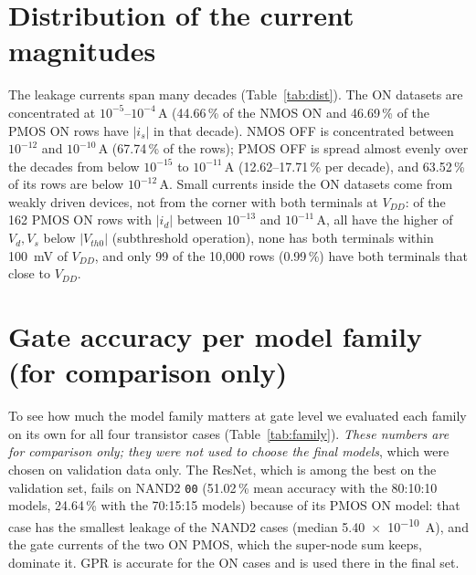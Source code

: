\appendices

\ifexpDist
\section{Distribution of the current magnitudes}\label{app:dist}
The leakage currents span many decades (Table~\ref{tab:dist}). The ON datasets are concentrated at $10^{-5}$--$10^{-4}$\,\si{\ampere} (44.66\,\% of the NMOS ON and 46.69\,\% of the PMOS ON rows have $|i_s|$ in that decade). NMOS OFF is concentrated between $10^{-12}$ and $10^{-10}$\,\si{\ampere} (67.74\,\% of the rows); PMOS OFF is spread almost evenly over the decades from below $10^{-15}$ to $10^{-11}$\,\si{\ampere} (12.62--17.71\,\% per decade), and 63.52\,\% of its rows are below $10^{-12}$\,\si{\ampere}.
Small currents inside the ON datasets come from weakly driven devices, not from the corner with both terminals at $V_{DD}$: of the 162 PMOS ON rows with $|i_d|$ between $10^{-13}$ and $10^{-11}$\,\si{\ampere}, all have the higher of $V_d,V_s$ below $|V_{th0}|$ (subthreshold operation), none has both terminals within \SI{100}{\milli\volt} of $V_{DD}$, and only 99 of the 10,000 rows (0.99\,\%) have both terminals that close to $V_{DD}$.
\begin{table}[t]
\caption{Distribution of $|i_s|$ in percent of the 10,000 rows per case.}
\label{tab:dist}
\centering\footnotesize
\setlength{\tabcolsep}{3pt}
\fitcol{}
\end{table}
\fi

\ifexpFamilies
\section{Gate accuracy per model family (for comparison only)}\label{app:family}
To see how much the model family matters at gate level we evaluated each family on its own for all four transistor cases (Table~\ref{tab:family}). \emph{These numbers are for comparison only; they were not used to choose the final models}, which were chosen on validation data only. The ResNet, which is among the best on the validation set, fails on NAND2 \texttt{00} (51.02\,\% mean accuracy with the 80:10:10 models, 24.64\,\% with the 70:15:15 models) because of its PMOS ON model: that case has the smallest leakage of the NAND2 cases (median \SI{5.40e-10}{\ampere}), and the gate currents of the two ON PMOS, which the super-node sum keeps, dominate it. GPR is accurate for the ON cases and is used there in the final set.
\begin{table}[t]
\caption{One model family for all four cases, gate and circuit mean accuracy (\%); for comparison only, not used for selection.}
\label{tab:family}
\centering\footnotesize
\setlength{\tabcolsep}{2.5pt}
\fitcol{}
\end{table}
\fi

